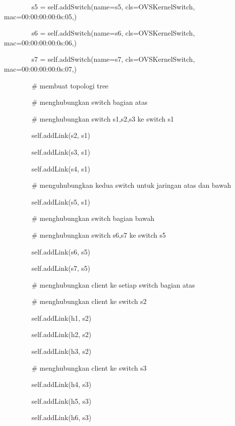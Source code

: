 \ \ \ \ \ \ \ \ s5 = self.addSwitch(name={\textquotedbl}s5{\textquotedbl}, cls=OVSKernelSwitch,
mac={\textquotedbl}00:00:00:00:0s:05{\textquotedbl},)

\ \ \ \ \ \ \ \ s6 = self.addSwitch(name={\textquotedbl}s6{\textquotedbl}, cls=OVSKernelSwitch,
mac={\textquotedbl}00:00:00:00:0s:06{\textquotedbl},)

\ \ \ \ \ \ \ \ s7 = self.addSwitch(name={\textquotedbl}s7{\textquotedbl}, cls=OVSKernelSwitch,
mac={\textquotedbl}00:00:00:00:0s:07{\textquotedbl},)


\bigskip

\ \ \ \ \ \ \ \ \# membuat topologi tree

\ \ \ \ \ \ \ \ \# menghubungkan switch bagian atas

\ \ \ \ \ \ \ \ \# menghubungkan switch s1,s2,s3 ke switch s1

\ \ \ \ \ \ \ \ self.addLink(s2, s1)

\ \ \ \ \ \ \ \ self.addLink(s3, s1)

\ \ \ \ \ \ \ \ self.addLink(s4, s1)


\bigskip

\ \ \ \ \ \ \ \ \# menguhubungkan kedua switch untuk jaringan atas dan bawah

\ \ \ \ \ \ \ \ self.addLink(s5, s1)


\bigskip

\ \ \ \ \ \ \ \ \# menghubungkan switch bagian bawah

\ \ \ \ \ \ \ \ \# menghubungkan switch s6,s7 ke switch s5

\ \ \ \ \ \ \ \ self.addLink(s6, s5)

\ \ \ \ \ \ \ \ self.addLink(s7, s5)


\bigskip

\ \ \ \ \ \ \ \ \# menghubungkan client ke setiap switch bagian atas

\ \ \ \ \ \ \ \ \# menghubungkan client ke switch s2

\ \ \ \ \ \ \ \ self.addLink(h1, s2)

\ \ \ \ \ \ \ \ self.addLink(h2, s2)

\ \ \ \ \ \ \ \ self.addLink(h3, s2)


\bigskip

\ \ \ \ \ \ \ \ \# menghubungkan client ke switch s3

\ \ \ \ \ \ \ \ self.addLink(h4, s3)

\ \ \ \ \ \ \ \ self.addLink(h5, s3)

\ \ \ \ \ \ \ \ self.addLink(h6, s3)


